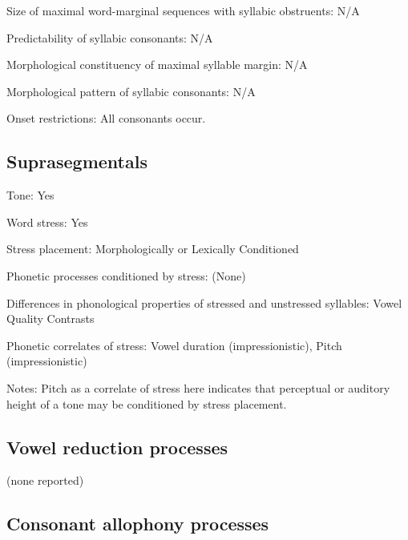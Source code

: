 {\begin{appendixdesc}
\item[Size of maximal word-marginal sequences with syllabic obstruents:] N/A

\item[Predictability of syllabic consonants:] N/A

\item[Morphological constituency of maximal syllable margin:] N/A

\item[Morphological pattern of syllabic consonants:] N/A

\item[Onset restrictions:] All consonants occur.
\end{appendixdesc}
\subsection*{Suprasegmentals}
\begin{appendixdesc}
\item[Tone:] Yes

\item[Word stress:] Yes

\item[Stress placement:] Morphologically or Lexically Conditioned

\item[Phonetic processes conditioned by stress:] (None)

\item[Differences in phonological properties of stressed and unstressed syllables:] Vowel Quality Contrasts

\item[Phonetic correlates of stress:] Vowel duration (impressionistic), Pitch (impressionistic)

\item[Notes:] Pitch as a correlate of stress here indicates that perceptual or auditory height of a tone may be conditioned by stress placement.
\end{appendixdesc}
\subsection*{Vowel reduction processes}

(none reported)

\subsection*{Consonant allophony processes}
\begin{appendixdesc}


\end{appendixdesc}}
